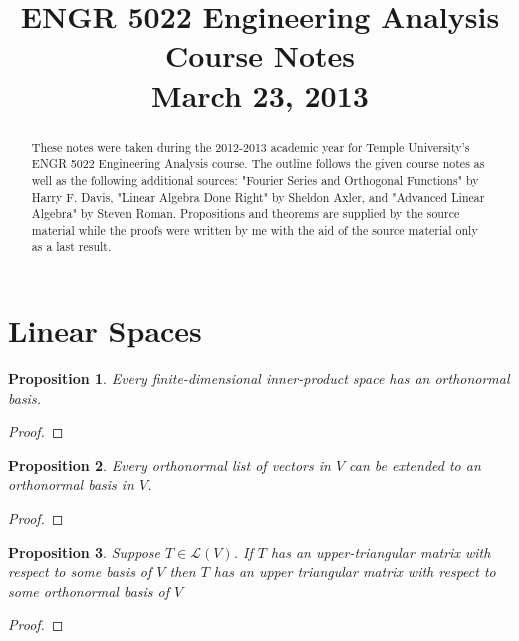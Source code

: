 \documentclass[conference,12pt,onecolumn,compsoc]{IEEEtran}
\title{\Large ENGR 5022 Engineering Analysis\\
\normalsize Course Notes \\
\normalsize March 23, 2013}
\author{\IEEEauthorblockN{Salvatore Giorgi}
\IEEEauthorblockA{salvatore.giorgi@temple.edu}
}
\begin{document}
\maketitle
\thispagestyle{empty}
\pagestyle{empty}

\newtheorem{theorem}{Theorem}[section]
\newtheorem{proposition}{Proposition}[section]
\newtheorem{lemma}{Lemma}[section]
\newtheorem{corollary}{Corollary}[section]
\newtheorem{example}{Example}[section]
\newtheorem{exercise}{Exercise}[section]
\newtheorem{definition}{Definition}[section]
\newtheorem{remark}{Remark}[section]

\begin{abstract}
These notes were taken during the 2012-2013 academic year for Temple University's ENGR 5022 Engineering Analysis course. The outline follows the given course notes as well as the following additional sources: "Fourier Series and Orthogonal Functions" by Harry F. Davis, "Linear Algebra Done Right" by Sheldon Axler, and "Advanced Linear Algebra" by Steven Roman. Propositions and theorems are supplied by the source material while the proofs were written by me with the aid of the source material only as a last result. 
\end{abstract}

\section{Linear Spaces}
\label{section: Linear Spaces}

\begin{proposition}
Every finite-dimensional inner-product space has an orthonormal basis.
\end{proposition}
\begin{proof}

\end{proof}

\begin{proposition}
Every orthonormal list of vectors in $V$ can be extended to an orthonormal basis in $V$.
\end{proposition}
\begin{proof}

\end{proof}

\begin{proposition}
Suppose $T\in \mathcal{L}(V)$. If $T$ has an upper-triangular matrix with respect to some basis of $V$ then $T$ has an upper triangular matrix with respect to some orthonormal basis of $V$
\end{proposition}
\begin{proof}

\end{proof}
\end{document}

